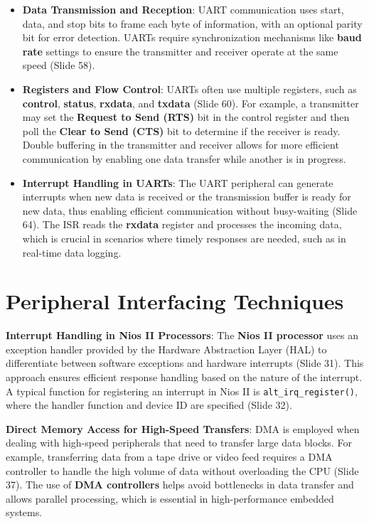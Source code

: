 \documentclass[
  14pt,
  a4paper,
  numbers=noendperiod,
  headinclude=true,
  footinclude=true,
  DIV=calc]{scrreprt}
\begin{document}
\begin{itemize}
\item
  \textbf{Data Transmission and Reception}: UART communication uses
  start, data, and stop bits to frame each byte of information, with an
  optional parity bit for error detection. UARTs require synchronization
  mechanisms like \textbf{baud rate} settings to ensure the transmitter
  and receiver operate at the same speed (Slide 58).
\item
  \textbf{Registers and Flow Control}: UARTs often use multiple
  registers, such as \textbf{control}, \textbf{status}, \textbf{rxdata},
  and \textbf{txdata} (Slide 60). For example, a transmitter may set the
  \textbf{Request to Send (RTS)} bit in the control register and then
  poll the \textbf{Clear to Send (CTS)} bit to determine if the receiver
  is ready. Double buffering in the transmitter and receiver allows for
  more efficient communication by enabling one data transfer while
  another is in progress.
\item
  \textbf{Interrupt Handling in UARTs}: The UART peripheral can generate
  interrupts when new data is received or the transmission buffer is
  ready for new data, thus enabling efficient communication without
  busy-waiting (Slide 64). The ISR reads the \textbf{rxdata} register
  and processes the incoming data, which is crucial in scenarios where
  timely responses are needed, such as in real-time data logging.
\end{itemize}

\section{Peripheral Interfacing
Techniques}\label{peripheral-interfacing-techniques}

\textbf{Interrupt Handling in Nios II Processors}: The \textbf{Nios II
processor} uses an exception handler provided by the Hardware
Abstraction Layer (HAL) to differentiate between software exceptions and
hardware interrupts (Slide 31). This approach ensures efficient response
handling based on the nature of the interrupt. A typical function for
registering an interrupt in Nios II is \texttt{alt\_irq\_register()},
where the handler function and device ID are specified (Slide 32).

\textbf{Direct Memory Access for High-Speed Transfers}: DMA is employed
when dealing with high-speed peripherals that need to transfer large
data blocks. For example, transferring data from a tape drive or video
feed requires a DMA controller to handle the high volume of data without
overloading the CPU (Slide 37). The use of \textbf{DMA controllers}
helps avoid bottlenecks in data transfer and allows parallel processing,
which is essential in high-performance embedded systems.
\end{document}
